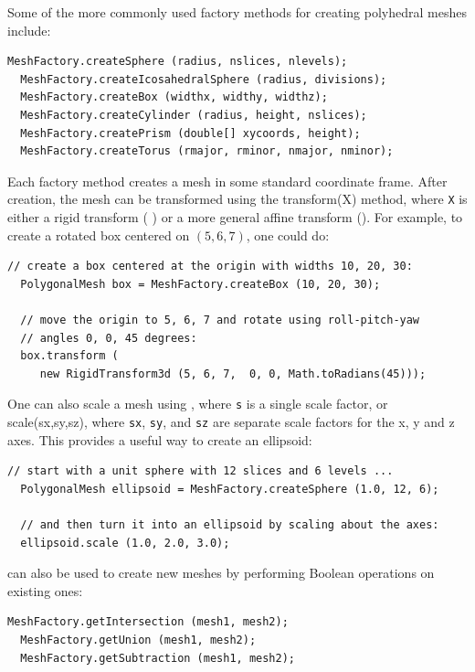 Some of the more commonly used factory methods for creating polyhedral
meshes include:
\begin{lstlisting}[]
  MeshFactory.createSphere (radius, nslices, nlevels);
  MeshFactory.createIcosahedralSphere (radius, divisions);
  MeshFactory.createBox (widthx, widthy, widthz);
  MeshFactory.createCylinder (radius, height, nslices);
  MeshFactory.createPrism (double[] xycoords, height);
  MeshFactory.createTorus (rmajor, rminor, nmajor, nminor);
\end{lstlisting}
%
Each factory method creates a mesh in some standard coordinate
frame. After creation, the mesh can be transformed using the
%
{transform(X)} method, where {\tt X} is either a rigid transform (
) or a more general affine
transform ().
For example, to create a rotated box centered on $(5, 6, 7)$,
one could do:
%
\begin{lstlisting}[]
  // create a box centered at the origin with widths 10, 20, 30:
  PolygonalMesh box = MeshFactory.createBox (10, 20, 30);

  // move the origin to 5, 6, 7 and rotate using roll-pitch-yaw
  // angles 0, 0, 45 degrees:
  box.transform (
     new RigidTransform3d (5, 6, 7,  0, 0, Math.toRadians(45)));
\end{lstlisting}
%
One can also scale a mesh using
,
where {\tt s} is a single scale factor, or
%
{scale(sx,sy,sz)}, where {\tt sx}, {\tt sy}, and {\tt sz} are separate
scale factors for the x, y and z axes. This provides a useful way to
create an ellipsoid:
%
\begin{lstlisting}[]
   // start with a unit sphere with 12 slices and 6 levels ...
  PolygonalMesh ellipsoid = MeshFactory.createSphere (1.0, 12, 6);

  // and then turn it into an ellipsoid by scaling about the axes:
  ellipsoid.scale (1.0, 2.0, 3.0);
\end{lstlisting}
%
 can also be used to create
new meshes by performing Boolean operations on existing ones:
%
\begin{lstlisting}[]
  MeshFactory.getIntersection (mesh1, mesh2);
  MeshFactory.getUnion (mesh1, mesh2);
  MeshFactory.getSubtraction (mesh1, mesh2);
\end{lstlisting}
%

